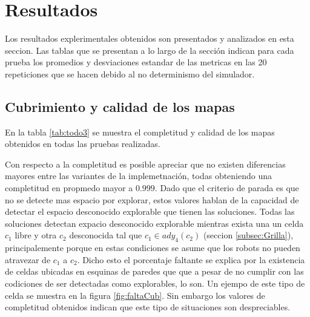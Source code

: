 \section{Resultados}
\newlength{\graphlen}
\setlength{\graphlen}{0.85\textwidth}


Los resultados explerimentales obtenidos son presentados y analizados en esta
seccion. Las tablas que se presentan a lo largo de la sección indican para cada
prueba los promedios y desviaciones estandar de las metricas en las 20
repeticiones que se hacen debido al no determinismo del simulador.

\subsection{Cubrimiento y calidad de los mapas}



En la tabla \ref{tab:todo3} se muestra el completitud y calidad de los mapas
obtenidos en todas las pruebas realizadas. 

Con respecto a la completitud es posible apreciar que no existen diferencias
mayores entre las variantes de la implemetnación, todas obteniendo una
completitud en propmedo mayor a $0.999$. Dado que el criterio de parada es que
no se detecte mas espacio por explorar, estos valores hablan de la capacidad de
detectar el espacio desconocido explorable que tienen las soluciones. Todas las
soluciones detectan expacio desconocido explorable mientras exista una un celda
$c_1$ libre y otra $c_2$ desconocida tal que $c_1 \in ady_4(c_2)$ (seccion
\ref{subsec:Grilla}), principalemente porque en estas condiciones se asume que
los robots no pueden atravezar de $c_1$ a $c_2$. Dicho esto el porcentaje
faltante se explica por la existencia de celdas ubicadas en esquinas de paredes
que que a pesar de no cumplir con las codiciones de ser detectadas como
explorables, lo son. Un ejempo de este tipo de celda se muestra en la figura
\ref{fig:faltaCub}. Sin embargo los valores de completitud obtenidos indican
que este tipo de situaciones son despreciables.

